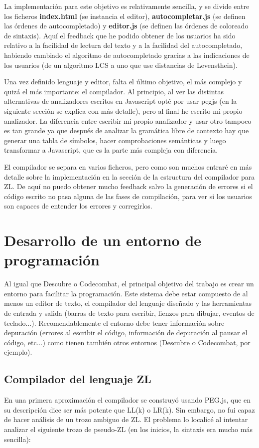 \documentclass{report}
\begin{document}
	La implementación para este objetivo es relativamente sencilla, y se divide entre los ficheros \textbf{index.html} (se instancia el editor), \textbf{autocompletar.js} (se definen las órdenes de autocompletado) y \textbf{editor.js} (se definen las órdenes de coloreado de sintaxis). Aquí el feedback que he podido obtener de los usuarios ha sido relativo a la facilidad de lectura del texto y a la facilidad del autocompletado, habiendo cambiado el algoritmo de autocompletado gracias a las indicaciones de los usuarios (de un algoritmo LCS a uno que use distancias de Levensthein). 
	
	Una vez definido lenguaje y editor, falta el último objetivo, el más complejo y quizá el más importante: el compilador. Al principio, al ver las distintas alternativas de analizadores escritos en Javascript opté por usar pegjs (en la siguiente sección se explica con más detalle), pero al final he escrito mi propio analizador. La diferencia entre escribir mi propio analizador y usar otro tampoco es tan grande ya que después de analizar la gramática libre de contexto hay que generar una tabla de símbolos, hacer comprobaciones semánticas y luego transformar a Javascript, que es la parte más compleja con diferencia.
	
	El compilador se separa en varios ficheros, pero como son muchos entraré en más detalle sobre la implementación en la sección de la estructura del compilador para ZL. De aquí no puedo obtener mucho feedback salvo la generación de errores si el código escrito no pasa alguna de las fases de compilación, para ver si los usuarios son capaces de entender los errores y corregirlos.
	
	\section{Desarrollo de un entorno de programación}
	Al igual que Descubre o Codecombat, el principal objetivo del trabajo es crear un entorno para facilitar la programación. Este sistema debe estar compuesto de al menos un editor de texto, el compilador del lenguaje diseñado y las herramientas de entrada y salida (barras de texto para escribir, lienzos para dibujar, eventos de teclado...). Recomendablemente el entorno debe tener información sobre depuración (errores al escribir el código, información de depuración al pausar el código, etc...) como tienen también otros entornos (Descubre o Codecombat, por ejemplo).
	
	
	\subsection{Compilador del lenguaje ZL}
	En una primera aproximación el compilador se construyó usando PEG.js\cite{pegjs}, que en su descripción dice ser más potente que LL(k) o LR(k). Sin embargo, no fui capaz de hacer análisis de un trozo ambiguo de ZL. El problema lo localicé al intentar analizar el siguiente trozo de pseudo-ZL (en los inicios, la sintaxis era mucho más sencilla):
	
\end{document}
